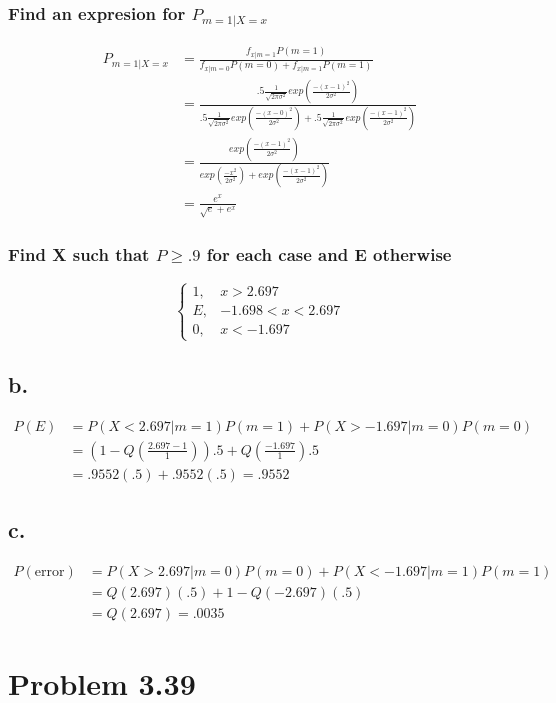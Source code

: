 \documentclass[12pt]{article}
\newcommand{\normD}[3]{\frac{1}{\sqrt{2\pi #1^2}}exp(\frac{-( #2 - #3)^2}{2 #1^2})}
\begin{document}
\subsubsection*{Find an expresion for $P_{m=1|X=x}$}
\begin{align*}
  P_{m=1|X=x} &= \frac{f_{x|m=1}P(m=1)}{f_{x|m=0}P(m=0)+f_{x|m=1}P(m=1)} \\
  &= \frac{.5\normD{\sigma}{x}{1}}{.5\normD{\sigma}{x}{0}+.5\normD{\sigma}{x}{1}} \\
  &= \frac{exp(\frac{-(x-1)^2}{2\sigma^2})}
    {exp(\frac{-x^2}{2\sigma^2})+exp(\frac{-(x-1)^2}{2\sigma^2})} \\
  &= \frac{e^x}{\sqrt{e}+e^x} 
\end{align*}
\subsubsection*{Find X such that $P \geq .9$ for each case and E otherwise}
\[
\begin{cases}
  1, & x > 2.697 \\
  E, & -1.698 < x < 2.697 \\
  0, & x < -1.697 
\end{cases}
\]
\subsection*{b.}
\begin{align*}
  P(E) &= P(X<2.697|m=1)P(m=1)+P(X>-1.697|m=0)P(m=0) \\
  &= (1 - Q(\frac{2.697-1}{1})).5 + Q(\frac{-1.697}{1}).5 \\
  &= .9552(.5) + .9552(.5) = .9552
\end{align*}
\subsection*{c.}
\begin{align*}
  P(\textrm{error}) &= P(X>2.697|m=0)P(m=0)+P(X<-1.697|m=1)P(m=1) \\
  &= Q(2.697)(.5) + 1 - Q(-2.697)(.5) \\
  &= Q(2.697) = .0035
\end{align*}

\section*{Problem 3.39}
\end{document}
